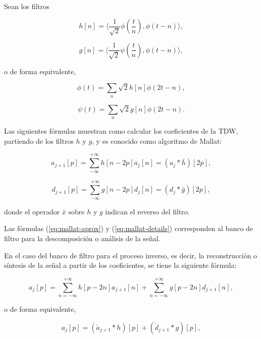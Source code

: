 Sean los filtros 

\begin{equation}
	h[n] = \langle \frac{1}{\sqrt{2}} \phi\left(\frac{t}{n}\right), \phi(t-n) \rangle,
\end{equation}

\begin{equation}
	g[n] = \langle \frac{1}{\sqrt{2}} \psi\left(\frac{t}{n}\right), \phi(t-n) \rangle,
\end{equation}

\noindent o de forma equivalente,

\begin{equation}
	\phi(t) = \sum_n \sqrt{2}h[n]\phi(2t-n),
\end{equation}

\begin{equation}
	\psi(t) = \sum_n \sqrt{2}g[n]\phi(2t-n).
\end{equation}

Las siguientes fórmulas muestran como calcular los coeficientes de la TDW, partiendo de los filtros 
$h$ y $g$, y es conocido como algoritmo de Mallat:

\begin{equation}\label{eq:mallat-aprox}
	a_{j+1}[p] = \sum_{-\infty}^{+\infty} h[n-2p]a_j[n] = (a_j * \bar h)[2p],
\end{equation}

\begin{equation}\label{eq:mallat-details}
	d_{j+1}[p] = \sum_{-\infty}^{+\infty} g[n-2p]d_j[n] = (d_j * \bar g)[2p],
\end{equation}

\noindent donde el operador $\bar x$ sobre $h$ y $g$ indican el reverso del filtro.

Las fórmulas (\ref{eq:mallat-aprox}) y (\ref{eq:mallat-details}) corresponden al banco de filtro para la
descomposición o análisis de la señal. 

En el caso del banco de filtro para el proceso inverso, es decir, la reconstrucción o síntesis de la señal a 
partir de los coeficientes, se tiene la siguiente fórmula:

\begin{equation}
	a_j[p] = \sum_{n= -\infty}^{+\infty} h[p-2n]a_{j+1}[n] + \sum_{n= -\infty}^{+\infty}g[p-2n]d_{j+1}[n],
\end{equation}

\noindent o de forma equivalente, 

\begin{equation}
	a_j[p] = ( \check a_{j+1} * h )[p] + ( \check d_{j+1} * g )[p],
\end{equation}

